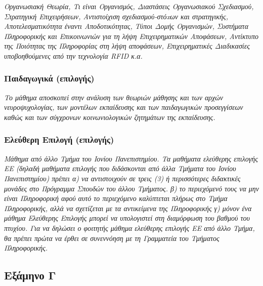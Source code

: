 \emph{Οργανωσιακή Θεωρία, Τι είναι Οργανισμός, Διαστάσεις Οργανωσιακού
Σχεδιασμού, Στρατηγική Επιχειρήσεων, Αντιστοίχιση σχεδιασμού-στόxων και
στρατηγικής, Αποτελεσματικότητα έναντι Αποδοτικότητας, Τύποι Δομής
Οργανισμών, Συστήματα Πληροφορικής και Επικοινωνιών για τη λήψη
Επιχειρηματικών Αποφάσεων, Αντίκτυπο της Ποιότητας της Πληροφορίας στη
λήψη αποφάσεων, Επιχειρηματικές Διαδικασίες υποβοηθούμενες από την
τεχνολογία RFID κ.α.}

\hypertarget{ux3c0ux3b1ux3b9ux3b4ux3b1ux3b3ux3c9ux3b3ux3b9ux3baux3ac-ux3b5ux3c0ux3b9ux3bbux3bfux3b3ux3aeux3c2}{%
\subsubsection{Παιδαγωγικά
(επιλογής)}\label{ux3c0ux3b1ux3b9ux3b4ux3b1ux3b3ux3c9ux3b3ux3b9ux3baux3ac-ux3b5ux3c0ux3b9ux3bbux3bfux3b3ux3aeux3c2}}

\emph{Το μάθημα αποσκοπεί στην ανάλυση των θεωριών μάθησης και των αρχών
νευροψυχολογίας, των μοντέλων εκπαίδευσης και των παιδαγωγικών
προσεγγίσεων καθώς και των σύγχρονων κοινωνιολογικών ζητημάτων της
εκπαίδευσης.}

\hypertarget{ux3b5ux3bbux3b5ux3cdux3b8ux3b5ux3c1ux3b7-ux3b5ux3c0ux3b9ux3bbux3bfux3b3ux3ae-ux3b5ux3c0ux3b9ux3bbux3bfux3b3ux3aeux3c2}{%
\subsubsection{Ελεύθερη Επιλογή
(επιλογής)}\label{ux3b5ux3bbux3b5ux3cdux3b8ux3b5ux3c1ux3b7-ux3b5ux3c0ux3b9ux3bbux3bfux3b3ux3ae-ux3b5ux3c0ux3b9ux3bbux3bfux3b3ux3aeux3c2}}

\emph{Μάθημα από άλλο Tμήμα του Ιονίου Πανεπιστημίου. Τα μαθήματα
ελεύθερης επιλογής ΕΕ (δηλαδή μαθήματα επιλογής που διδάσκονται από άλλα
Τμήματα του Ιονίου Πανεπιστημίου) πρέπει α) να αντιστοιχούν σε τρεις (3)
ή περισσότερες διδακτικές μονάδες στο Πρόγραμμα Σπουδών του άλλου
Τμήματος. β) το περιεχόμενό τους να μην είναι Πληροφορική αφού αυτό το
περιεχόμενο καλύπτεται πλήρως στο Τμήμα Πληροφορικής, αλλά να σχετίζεται
με τα αντικείμενα της Πληροφορικής γ) μόνον ένα μάθημα Ελεύθερης
Επιλογής μπορεί να υπολογιστεί στη διαμόρφωση του βαθμού του πτυχίου.
Για να δηλώσει ο φοιτητής μάθημα ελεύθερης επιλογής ΕΕ από άλλο Τμήμα,
θα πρέπει πρώτα να έρθει σε συνεννόηση με τη Γραμματεία του Τμήματος
Πληροφορικής.}

\hypertarget{ux3b5ux3beux3acux3bcux3b7ux3bdux3bf-ux3b3}{%
\subsection{Εξάμηνο Γ}\label{ux3b5ux3beux3acux3bcux3b7ux3bdux3bf-ux3b3}}

